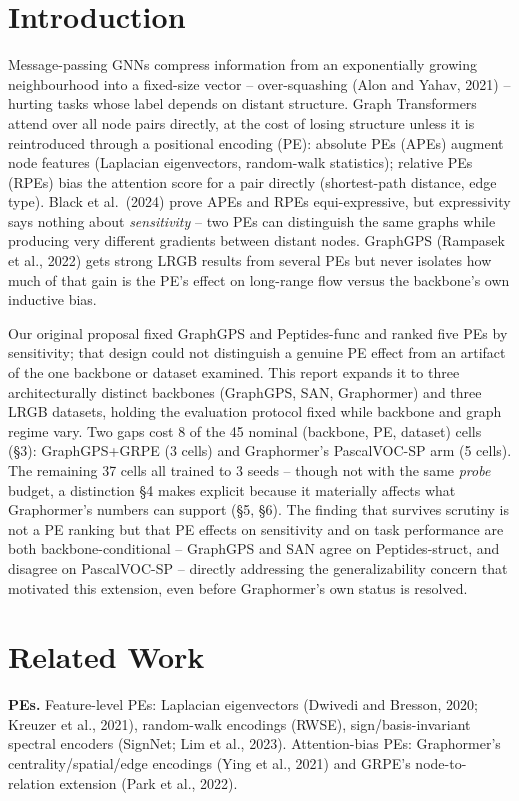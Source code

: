 \documentclass[10pt]{article}
\begin{document}
\section{Introduction}
Message-passing GNNs compress information from an exponentially growing neighbourhood into a fixed-size vector -- over-squashing (Alon and Yahav, 2021) -- hurting tasks whose label depends on distant structure. Graph Transformers attend over all node pairs directly, at the cost of losing structure unless it is reintroduced through a positional encoding (PE): absolute PEs (APEs) augment node features (Laplacian eigenvectors, random-walk statistics); relative PEs (RPEs) bias the attention score for a pair directly (shortest-path distance, edge type). Black et al.\ (2024) prove APEs and RPEs equi-expressive, but expressivity says nothing about \emph{sensitivity} -- two PEs can distinguish the same graphs while producing very different gradients between distant nodes. GraphGPS (Rampasek et al., 2022) gets strong LRGB results from several PEs but never isolates how much of that gain is the PE's effect on long-range flow versus the backbone's own inductive bias.

Our original proposal fixed GraphGPS and Peptides-func and ranked five PEs by sensitivity; that design could not distinguish a genuine PE effect from an artifact of the one backbone or dataset examined. This report expands it to three architecturally distinct backbones (GraphGPS, SAN, Graphormer) and three LRGB datasets, holding the evaluation protocol fixed while backbone and graph regime vary. Two gaps cost 8 of the 45 nominal (backbone, PE, dataset) cells (\S3): GraphGPS+GRPE (3 cells) and Graphormer's PascalVOC-SP arm (5 cells). The remaining 37 cells all trained to 3 seeds -- though not with the same \emph{probe} budget, a distinction \S4 makes explicit because it materially affects what Graphormer's numbers can support (\S5, \S6). The finding that survives scrutiny is not a PE ranking but that PE effects on sensitivity and on task performance are both backbone-conditional -- GraphGPS and SAN agree on Peptides-struct, and disagree on PascalVOC-SP -- directly addressing the generalizability concern that motivated this extension, even before Graphormer's own status is resolved.

\section{Related Work}
\textbf{PEs.} Feature-level PEs: Laplacian eigenvectors (Dwivedi and Bresson, 2020; Kreuzer et al., 2021), random-walk encodings (RWSE), sign/basis-invariant spectral encoders (SignNet; Lim et al., 2023). Attention-bias PEs: Graphormer's centrality/spatial/edge encodings (Ying et al., 2021) and GRPE's node-to-relation extension (Park et al., 2022).
\end{document}

